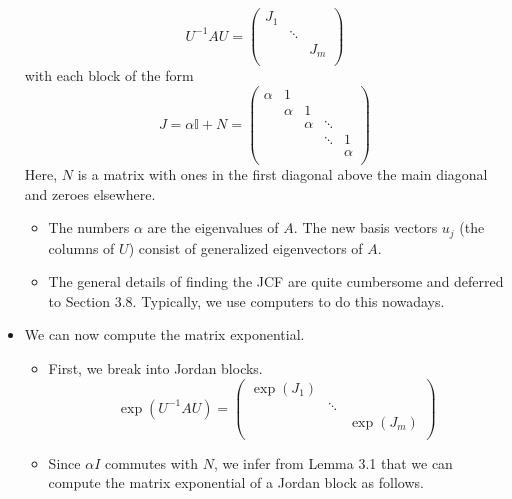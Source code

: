 \documentclass[../notes.tex]{subfiles}
\begin{document}
\begin{itemize}
\begin{equation*}
        U^{-1}AU =
        \begin{pmatrix}
            J_1 &  & \\
             & \ddots & \\
             &  & J_m\\
        \end{pmatrix}
    \end{equation*}
    with each block of the form
    \begin{equation*}
        J = \alpha\mathbb{I}+N
        =
        \begin{pmatrix}
            \alpha & 1 &  &  & \\
             & \alpha & 1 &  & \\
             &  & \alpha & \ddots & \\
             &  &  & \ddots & 1\\
             &  &  &  & \alpha\\
        \end{pmatrix}
    \end{equation*}
    Here, $N$ is a matrix with ones in the first diagonal above the main diagonal and zeroes elsewhere.
    \begin{itemize}
        \item The numbers $\alpha$ are the eigenvalues of $A$. The new basis vectors $u_j$ (the columns of $U$) consist of generalized eigenvectors of $A$.
        \item The general details of finding the JCF are quite cumbersome and deferred to Section 3.8. Typically, we use computers to do this nowadays.
    \end{itemize}
    \item We can now compute the matrix exponential.
    \begin{itemize}
        \item First, we break into Jordan blocks.
        \begin{equation*}
            \exp(U^{-1}AU) =
            \begin{pmatrix}
                \exp(J_1) &  & \\
                 & \ddots & \\
                 &  & \exp(J_m)\\
            \end{pmatrix}
        \end{equation*}
        \item Since $\alpha I$ commutes with $N$, we infer from Lemma 3.1 that we can compute the matrix exponential of a Jordan block as follows.

\end{itemize}
\end{itemize}
\end{document}
